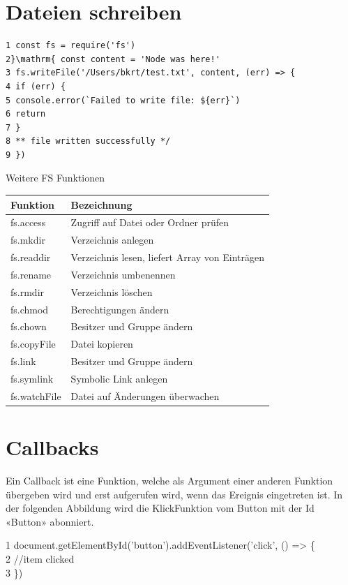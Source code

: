 \documentclass[10pt]{article}
\begin{document}
\section*{Dateien schreiben}
\begin{verbatim}
1 const fs = require('fs')
2}\mathrm{ const content = 'Node was here!'
3 fs.writeFile('/Users/bkrt/test.txt', content, (err) => {
4 if (err) {
5 console.error(`Failed to write file: ${err}`)
6 return
7 }
8 ** file written successfully */
9 })
\end{verbatim}

Weitere FS Funktionen

\begin{center}
\begin{tabular}{|l|l|}
\hline
Funktion & Bezeichnung \\
\hline
fs.access & Zugriff auf Datei oder Ordner prüfen \\
\hline
fs.mkdir & Verzeichnis anlegen \\
\hline
fs.readdir & Verzeichnis lesen, liefert Array von Einträgen \\
\hline
fs.rename & Verzeichnis umbenennen \\
\hline
fs.rmdir & Verzeichnis löschen \\
\hline
fs.chmod & Berechtigungen ändern \\
\hline
fs.chown & Besitzer und Gruppe ändern \\
\hline
fs.copyFile & Datei kopieren \\
\hline
fs.link & Besitzer und Gruppe ändern \\
\hline
fs.symlink & Symbolic Link anlegen \\
\hline
fs.watchFile & Datei auf Änderungen überwachen \\
\hline
\end{tabular}
\end{center}

\section*{Callbacks}
Ein Callback ist eine Funktion, welche als Argument einer anderen Funktion übergeben wird und erst aufgerufen wird, wenn das Ereignis eingetreten ist. In der folgenden Abbildung wird die KlickFunktion vom Button mit der Id «Button» abonniert.

1 document.getElementById('button').addEventListener('click', () => \{\\
2 //item clicked\\
3 \})
\end{document}
